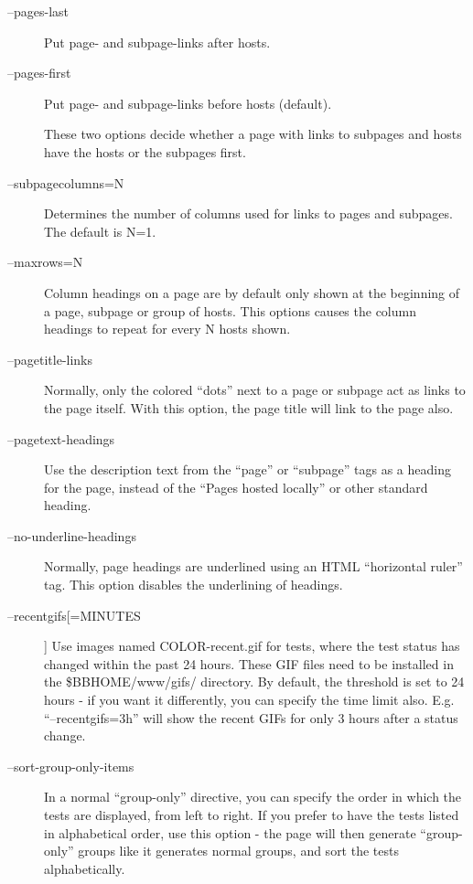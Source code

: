  \begin{description}
\item[--pages-last] Put page- and subpage-links after hosts. 
\item[--pages-first] Put page- and subpage-links before hosts (default). 

  These two options decide whether a page with links to subpages and hosts have the hosts or the subpages first. 


 

\item[--subpagecolumns=N] Determines the number of columns used for links to pages and subpages. The default is N=1. 

 

\item[--maxrows=N] Column headings on a page are by default only shown
  at the beginning of a page, subpage or group of hosts. This options
  causes the column headings to repeat for every N hosts shown. 


 

\item[--pagetitle-links] Normally, only the colored ``dots'' next to a
  page or subpage act as links to the page itself. With this option,
  the page title will link to the page also. 


 

\item[--pagetext-headings] Use the description text from the ``page''
  or ``subpage'' tags as a heading for the page, instead of the
  ``Pages hosted locally'' or other standard heading. 


 

\item[--no-underline-headings] Normally, page headings are underlined
  using an HTML ``horizontal ruler'' tag. This option disables the
  underlining of headings. 


 

\item[--recentgifs[=MINUTES]] Use images named COLOR-recent.gif for
  tests, where the test status has changed within the past 24
  hours. These GIF files need to be installed in the
  \$BBHOME/www/gifs/ directory. By default, the threshold is set to 24
  hours - if you want it differently, you can specify the time limit
  also. E.g. ``--recentgifs=3h'' will show the recent GIFs for only 3
  hours after a status change. 


 

\item[--sort-group-only-items] In a normal ``group-only'' directive,
  you can specify the order in which the tests are displayed, from
  left to right. If you prefer to have the tests listed in
  alphabetical order, use this option - the page will then generate
  ``group-only'' groups like it generates normal groups, and sort the
  tests alphabetically. 



\end{description}
